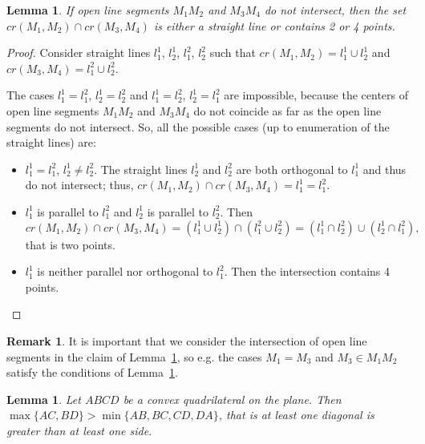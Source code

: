 \documentclass[a4paper,14pt]{article} %
\theoremstyle{plain}
\newtheorem{lemma}[theorem]{Lemma}
\theoremstyle{definition}
\newtheorem{remark}[theorem]{Remark}
\begin{document}
\begin{lemma}
	\label{lem:intervals_cross}
	If open line segments $M_1 M_2$ and $M_3 M_4$ do not intersect,
	then the set $cr(M_1,M_2) \cap cr(M_3,M_4)$ is either a straight line or contains 2 or 4 points.
\end{lemma}

\begin{proof}
	Consider straight lines $l^1_1$, $l^1_2$, $l^2_1$, $l^2_2$
	such that $cr(M_1,M_2) = l^1_1 \cup l^1_2$ and $cr(M_3,M_4) = l^2_1 \cup l^2_2$.

	The cases $l^1_1 = l^2_1$, $l^1_2 = l^2_2$ and $l^1_1 = l^2_2$, $l^1_2 = l^2_1$ are impossible,
	because the centers of open line segments $M_1 M_2$ and $M_3 M_4$ do not coincide as far as
	the open line segments do not intersect.
	So, all the possible cases (up to enumeration of the straight lines) are:
	\begin{itemize}
		\item
			$l^1_1 = l^2_1$, $l^1_2 \neq l^2_2$.
			The straight lines $l^1_2$ and $l^2_2$ are both orthogonal to $l^1_1$ and thus do not intersect;
			thus, $cr(M_1,M_2) \cap cr(M_3,M_4) = l^1_1 = l^2_1$.
		\item
			$l^1_1$ is parallel to $l^2_1$ and $l^1_2$ is parallel to $l^2_2$.
			Then
			\begin{equation*}
				cr(M_1,M_2) \cap cr(M_3,M_4) = (l^1_1 \cup l^1_2)\cap(l^2_1 \cup l^2_2) =
				(l^1_1 \cap l^2_2) \cup (l^1_2 \cap l^2_1)
				,
			\end{equation*}
			that is two points.
		\item
			$l^1_1$ is neither parallel nor orthogonal to $l^2_1$.
			Then the intersection contains 4 points.
	\end{itemize}
\end{proof}

\begin{remark}
	It is important that we consider the intersection of open line segments in the claim of Lemma~\ref{lem:intervals_cross},
	so e.g. the cases $M_1 = M_3$ and $M_3 \in M_1 M_2$ satisfy the conditions of Lemma~\ref{lem:intervals_cross}.
\end{remark}

\begin{lemma}
	\label{lemma:quadr_diag_edges}
	Let $ABCD$ be a convex quadrilateral on the plane.
	Then $\max\{AC,BD\}>\min\{AB,BC,CD,DA\}$,
	that is at least one diagonal is greater than at least one side.
\end{lemma}
\end{document}
